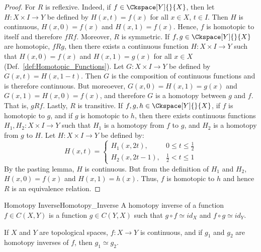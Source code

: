 \documentclass{article}                                                        %
\begin{document}
        \begin{proof}
            For $R$ is reflexive. Indeed, if $f\in\Ckspace[Y]{}{X}$, then let
            $H:X\times{I}\rightarrow{Y}$ be defined by $H(x,t)=f(x)$ for all
            $x\in{X}$, $t\in{I}$. Then $H$ is continuous, $H(x,0)=f(x)$ and
            $H(x,1)=f(x)$. Hence, $f$ is homotopic to itself and therefore
            $fRf$. Moreover, $R$ is symmetric. If $f,g\in\Ckspace[Y]{}{X}$ are
            homotopic, $fRg$, then there exists a continuous function
            $H:X\times{I}\rightarrow{Y}$ such that $H(x,0)=f(x)$ and
            $H(x,1)=g(x)$ for all $x\in{X}$
            (Def.~\ref{def:Homotopic_Functions}). Let
            $G:X\times{I}\rightarrow{Y}$ be defined by
            $G(x,t)=H(x,1-t)$. Then $G$ is the composition of continuous
            functions and is therefore continuous. But moreoever,
            $G(x,0)=H(x,1)=g(x)$ and $G(x,1)=H(x,0)=f(x)$, and therefore
            $G$ is a homotopy between $g$ and $f$. That is, $gRf$. Lastly, $R$
            is transitive. If $f,g,h\in\Ckspace[Y]{}{X}$, if $f$ is homotopic to
            $g$, and if $g$ is homotopic to $h$, then there exists continuous
            functions $H_{1},H_{2}:X\times{I}\rightarrow{Y}$ such that $H_{1}$
            is a homotopy from $f$ to $g$, and $H_{2}$ is a homotopy from $g$ to
            $H$. Let $H:X\times{I}\rightarrow{Y}$ be defined by:
            \begin{equation}
                H(x,t)=
                \begin{cases}
                    H_{1}(x,2t),&{0}\leq{t}\leq\frac{1}{2}\\
                    H_{2}(x,2t-1),&\frac{1}{2}<{t}\leq{1}
                \end{cases}
            \end{equation}
            By the pasting lemma, $H$ is continuous. But from the definition of
            $H_{1}$ and $H_{2}$, $H(x,0)=f(x)$ and $H(x,1)=h(x)$. Thus,
            $f$ is homotopic to $h$ and hence $R$ is an equivalence relation.
        \end{proof}
        \begin{ldefinition}{Homotopy Inverse}{Homotopy_Inverse}
            A homotopy inverse of a function $f\in{C}(X,Y)$ is a function
            $g\in{C}(Y,X)$ such that $g\circ{f}\simeq{id}_{X}$ and
            $f\circ{g}\simeq{id}_{Y}$.
        \end{ldefinition}
        \begin{theorem}
            If $X$ and $Y$ are topological spaces, $f:X\rightarrow{Y}$ is
            continuous, and if $g_{1}$ and $g_{2}$ are homotopy inverses
            of $f$, then $g_{1}\simeq{g}_{2}$.
        \end{theorem}
\end{document}
